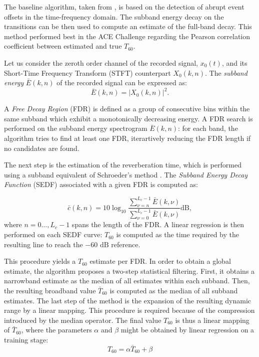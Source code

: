 The baseline algorithm, taken from \cite{prego2012blind}, is based on the detection of abrupt event offsets in the time-frequency domain. The subband energy decay on the transitions can be then used to compute an estimate of the full-band decay. This method performed best in the ACE Challenge regarding the Pearson correlation coefficient between estimated and true $T_{60}$\cite{eaton2016estimation}.

Let us consider the zeroth order channel of the recorded signal, $x_0(t)$, and its Short-Time Frequency Transform (STFT) counterpart $X_0(k,n)$.
The \textit{subband energy} $\bar{E}(k,n)$ of the recorded signal can be expressed as:\begin{equation}
	\bar{E}(k,n) = |X_0(k,n)|^2.
\end{equation}

A \textit{Free Decay Region} (FDR) is defined as a group of consecutive bins within the same subband which exhibit a monotonically decreasing energy. 
A FDR search is performed on the subband energy spectrogram $\bar{E}(k,n)$: for each band, the algorithm tries to find at least one FDR, iterartively reducing the FDR length if no candidates are found. 

The next step is the estimation of the reverberation time, which is performed using a subband equivalent of Schroeder's method \cite{schroeder1965new}.
The \textit{Subband Energy Decay Function} (SEDF) associated with a given FDR is computed as:

\begin{equation}
	\bar{c}(k,n) = 10 \log_{10} \frac{\sum_{\nu=n}^{L_c-1} \bar{E}(k,\nu)} {\sum_{\nu=0}^{L_c-1} \bar{E}(k,\nu)} \text{dB},
\end{equation}
where $n = 0 \ldots, L_c-1$ spans the length of the FDR. A linear regression is then performed on each SEDF curve: $T_{60}$ is computed as the time required by the resulting line to reach the $-60 \text{ dB}$ reference.

This procedure yields a $T_{60}$ estimate per FDR. In order to obtain a global estimate, the algorithm proposes a two-step statistical filtering. First, it obtains a narrowband estimate as the median of all estimates within each subband. Then, the resulting broadband value $\bar{T}_{60}$ is computed as the median of all subband estimates.
The last step of the method is the expansion of the resulting dynamic range by a linear mapping. This procedure is required because of the compression introduced by the median operator. The final value $T_{60}$ is thus a linear mapping of $\bar{T}_{60}$, where the parameters $\alpha$ and $\beta$ might be obtained by linear regression on a training stage:
\begin{equation}
	T_{60} = \alpha \bar{T}_{60} + \beta
\label{eq:expansion}
	\end{equation}



